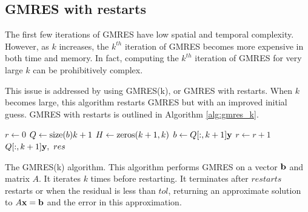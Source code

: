 \subsection*{GMRES with restarts}
The first few iterations of GMRES have low spatial and temporal complexity. 
However, as $k$ increases, the $k^{th}$ iteration of GMRES becomes more expensive in both time and memory.
In fact, computing the $k^{th}$ iteration of GMRES for very large $k$ can be prohibitively complex.

This issue is addressed by using GMRES(k), or GMRES with restarts.
When $k$ becomes large, this algorithm restarts GMRES but with an improved initial guess.
GMRES with restarts is outlined in Algorithm \ref{alg:gmres_k}.


\begin{algorithm}
\begin{algorithmic}[1]
  \State $r \gets 0$ 
  \State $Q \gets \empty{\size{b}}{k+1}$			
\State $H \gets \zeros{k+1}{ k}$
    \State $b \gets Q[:,k+1]{\bf y}$
    \State $r \gets r+1$
    \EndWhile
    \State {} $Q[:,k+1]{\bf y}, \,\, res$		
\EndProcedure
\end{algorithmic}
\caption{The GMRES(k) algorithm. This algorithm performs GMRES on a vector ${\bf b}$ and matrix $A$. It iterates $k$ times before restarting. 
It terminates after $restarts$ restarts or when the residual is less than $tol$, returning an approximate solution to $A{\bf x}={\bf b}$ and the error in this approximation. }
\label{alg:gmres_k}
\end{algorithm}





